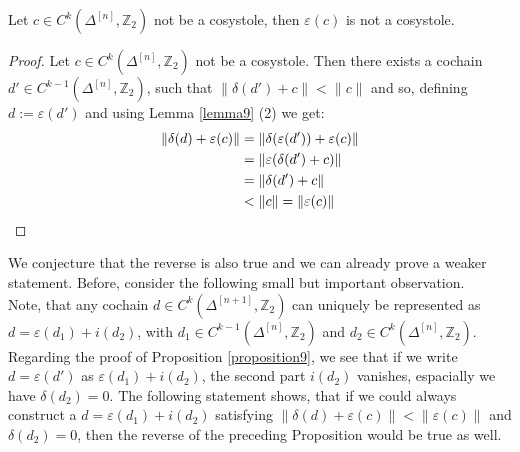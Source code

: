 \begin{prop}\label{proposition9}
Let \(c\in C^k(\Delta^{[n]},\mathbb{Z}_2)\) not be a cosystole, then \(\varepsilon(c)\) is not a cosystole.
\begin{proof}
Let \(c\in C^k(\Delta^{[n]},\mathbb{Z}_2)\) not be a cosystole. Then there exists a cochain \(d'\in C^{k-1}(\Delta^{[n]},\mathbb{Z}_2)\), such that \(\|\delta(d')+c\| < \|c\|\) and so, defining \(d:=\varepsilon(d')\) and using Lemma \ref{lemma9} (2) we get:
\begin{align}
\|\delta(d)+\varepsilon(c)\|&=\|\delta(\varepsilon(d'))+\varepsilon(c)\|\notag\\
&=\|\varepsilon(\delta(d')+c)\|\notag\\
&=\|\delta(d')+c\|\notag\\
&<\|c\|=\|\varepsilon(c)\|\notag
\end{align}
\end{proof}
\end{prop}
We conjecture that the reverse is also true and we can already prove a weaker statement. Before, consider the following small but important observation.\\
Note, that any cochain \(d\in C^k(\Delta^{[n+1]},\mathbb{Z}_2)\) can uniquely be represented as\\
\(d=\varepsilon(d_1)+i(d_2)\), with \(d_1\in C^{k-1}(\Delta^{[n]},\mathbb{Z}_2)\) and \(d_2\in C^k(\Delta^{[n]},\mathbb{Z}_2)\). Regarding the proof of Proposition \ref{proposition9}, we see that if we write \(d=\varepsilon(d')\) as \(\varepsilon(d_1)+i(d_2)\), the second part \(i(d_2)\) vanishes, espacially we have \(\delta(d_2)=0\). The following statement shows, that if we could always construct a \(d=\varepsilon(d_1)+i(d_2)\) satisfying \(\|\delta(d)+\varepsilon(c)\|<\|\varepsilon(c)\|\) and \(\delta(d_2)=0\), then the reverse of the preceding Proposition would be true as well.
